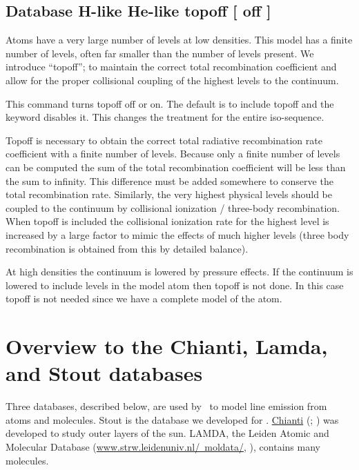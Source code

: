 \subsection{Database H-like \OR{} He-like topoff [ off ]} 

Atoms have a very large number of levels at low densities.
This model has a finite number of levels, often far smaller than
the number of levels present.
We introduce ``topoff''; to maintain the correct total recombination coefficient and
allow for the proper collisional coupling of the highest levels to the continuum.

This command turns topoff off or on.
The default is to include topoff and the keyword  disables it.
This changes the treatment for the entire iso-sequence.

Topoff is necessary to obtain the correct total
radiative recombination rate coefficient with a finite number of levels.
Because only a finite number of levels can be computed the sum
of the total
recombination coefficient will be less than the sum to infinity.
This difference must be added somewhere to conserve the
total recombination rate.  
Similarly, the very highest physical levels should be coupled to the continuum by
collisional ionization / three-body recombination.
When topoff is included the collisional ionization rate for the highest level is increased
by a large factor to mimic the effects of much higher levels 
(three body recombination is obtained from this by detailed balance).

At high densities the continuum is lowered by pressure effects.  If the continuum
is lowered to include levels in the model atom then topoff is not done.
In this case topoff is not needed since we have a complete model of the atom.

\section{Overview to the Chianti, Lamda, and Stout databases}

Three databases, described below, are used by \Cloudy\
to model line emission from atoms and molecules.
Stout is the database we developed for \Cloudy.
\href{http://www.chiantidatabase.org/}{Chianti}  
(\cite{Dere.K97CHIANTI---an-atomic-database-for-emission}; \cite{Landi2012})
was developed to study outer layers of the sun.
LAMDA, the Leiden Atomic and Molecular
Database (\href{http://www.strw.leidenuniv.nl/~moldata/}{www.strw.leidenuniv.nl/~moldata/}, 
\citet{Schoier.F05An-atomic-and-molecular-database-for-analysis}),
contains many molecules.

